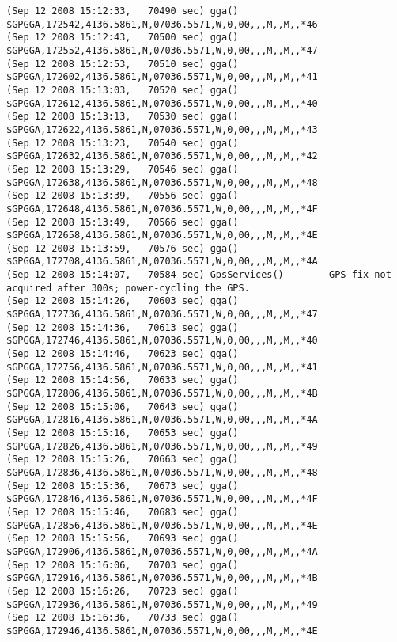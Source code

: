 {\begin{verbatim}
(Sep 12 2008 15:12:33,   70490 sec) gga()                $GPGGA,172542,4136.5861,N,07036.5571,W,0,00,,,M,,M,,*46
(Sep 12 2008 15:12:43,   70500 sec) gga()                $GPGGA,172552,4136.5861,N,07036.5571,W,0,00,,,M,,M,,*47
(Sep 12 2008 15:12:53,   70510 sec) gga()                $GPGGA,172602,4136.5861,N,07036.5571,W,0,00,,,M,,M,,*41
(Sep 12 2008 15:13:03,   70520 sec) gga()                $GPGGA,172612,4136.5861,N,07036.5571,W,0,00,,,M,,M,,*40
(Sep 12 2008 15:13:13,   70530 sec) gga()                $GPGGA,172622,4136.5861,N,07036.5571,W,0,00,,,M,,M,,*43
(Sep 12 2008 15:13:23,   70540 sec) gga()                $GPGGA,172632,4136.5861,N,07036.5571,W,0,00,,,M,,M,,*42
(Sep 12 2008 15:13:29,   70546 sec) gga()                $GPGGA,172638,4136.5861,N,07036.5571,W,0,00,,,M,,M,,*48
(Sep 12 2008 15:13:39,   70556 sec) gga()                $GPGGA,172648,4136.5861,N,07036.5571,W,0,00,,,M,,M,,*4F
(Sep 12 2008 15:13:49,   70566 sec) gga()                $GPGGA,172658,4136.5861,N,07036.5571,W,0,00,,,M,,M,,*4E
(Sep 12 2008 15:13:59,   70576 sec) gga()                $GPGGA,172708,4136.5861,N,07036.5571,W,0,00,,,M,,M,,*4A
(Sep 12 2008 15:14:07,   70584 sec) GpsServices()        GPS fix not acquired after 300s; power-cycling the GPS.
(Sep 12 2008 15:14:26,   70603 sec) gga()                $GPGGA,172736,4136.5861,N,07036.5571,W,0,00,,,M,,M,,*47
(Sep 12 2008 15:14:36,   70613 sec) gga()                $GPGGA,172746,4136.5861,N,07036.5571,W,0,00,,,M,,M,,*40
(Sep 12 2008 15:14:46,   70623 sec) gga()                $GPGGA,172756,4136.5861,N,07036.5571,W,0,00,,,M,,M,,*41
(Sep 12 2008 15:14:56,   70633 sec) gga()                $GPGGA,172806,4136.5861,N,07036.5571,W,0,00,,,M,,M,,*4B
(Sep 12 2008 15:15:06,   70643 sec) gga()                $GPGGA,172816,4136.5861,N,07036.5571,W,0,00,,,M,,M,,*4A
(Sep 12 2008 15:15:16,   70653 sec) gga()                $GPGGA,172826,4136.5861,N,07036.5571,W,0,00,,,M,,M,,*49
(Sep 12 2008 15:15:26,   70663 sec) gga()                $GPGGA,172836,4136.5861,N,07036.5571,W,0,00,,,M,,M,,*48
(Sep 12 2008 15:15:36,   70673 sec) gga()                $GPGGA,172846,4136.5861,N,07036.5571,W,0,00,,,M,,M,,*4F
(Sep 12 2008 15:15:46,   70683 sec) gga()                $GPGGA,172856,4136.5861,N,07036.5571,W,0,00,,,M,,M,,*4E
(Sep 12 2008 15:15:56,   70693 sec) gga()                $GPGGA,172906,4136.5861,N,07036.5571,W,0,00,,,M,,M,,*4A
(Sep 12 2008 15:16:06,   70703 sec) gga()                $GPGGA,172916,4136.5861,N,07036.5571,W,0,00,,,M,,M,,*4B
(Sep 12 2008 15:16:26,   70723 sec) gga()                $GPGGA,172936,4136.5861,N,07036.5571,W,0,00,,,M,,M,,*49
(Sep 12 2008 15:16:36,   70733 sec) gga()                $GPGGA,172946,4136.5861,N,07036.5571,W,0,00,,,M,,M,,*4E

\end{verbatim}}
